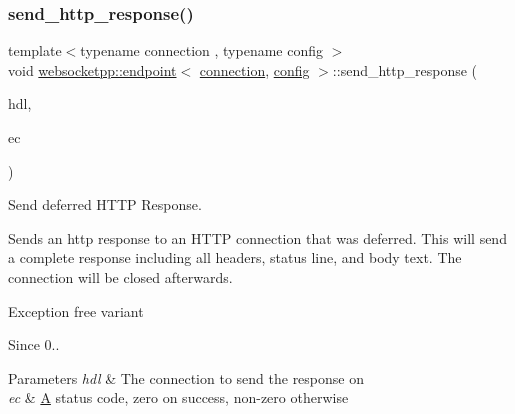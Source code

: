 \subsubsection{\texorpdfstring{send\+\_\+http\+\_\+response()}{send\_http\_response()}\hspace{0.1cm}{\footnotesize\ttfamily [1/2]}}
{\footnotesize\ttfamily template$<$typename connection , typename config $>$ \\
void \mbox{\hyperlink{classwebsocketpp_1_1endpoint}{websocketpp\+::endpoint}}$<$ \mbox{\hyperlink{classwebsocketpp_1_1connection}{connection}}, \mbox{\hyperlink{classconfig}{config}} $>$\+::send\+\_\+http\+\_\+response (\begin{DoxyParamCaption}\item[{\mbox{\hyperlink{namespacewebsocketpp_a6b3d26a10ee7229b84b776786332631d}{connection\+\_\+hdl}}}]{hdl,  }\item[{lib\+::error\+\_\+code \&}]{ec }\end{DoxyParamCaption})}



Send deferred H\+T\+TP Response. 

Sends an http response to an H\+T\+TP connection that was deferred. This will send a complete response including all headers, status line, and body text. The connection will be closed afterwards.

Exception free variant

\begin{DoxySince}{Since}
0..
\end{DoxySince}

\begin{DoxyParams}{Parameters}
{\em hdl} & The connection to send the response on \\
\hline
{\em ec} & \mbox{\hyperlink{struct_a}{A}} status code, zero on success, non-\/zero otherwise \\
\hline
\end{DoxyParams}
\mbox{\label{classwebsocketpp_1_1endpoint_af29ca34a6659beea0422a2f27718b9c2}} 
